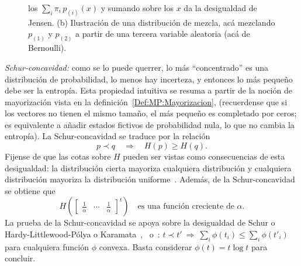 \begin{propiedades}
\begin{figure}[h!]
{    los $\sum_i \pi_i \, p_{(i)}(x)$ y sumando sobre los $x$  da la desigualdad de
    Jensen.  (b) Ilustraci\'on de  una distribuci\'on de mezcla, ac\'a mezclando
    $p_{(1)}$ y $p_{(2)}$  a partir de una tercera  variable aleatoria (ac\'a de
    Bernoulli).}
  \label{Fig:SZ:Concavidad}
  \end{figure}
%
\setcounter{PropSchurConcavidad}{\value{enumi}}
\item\label{Prop:SZ:Schurconcavidad}  {\it Schur-concavidad:}  como se  lo puede
  querrer, lo  m\'as ``concentrado'' es  una distribuci\'on de  probabilidad, lo
  menos hay  incerteza, y  entonces lo m\'as  peque\~no debe ser  la entrop\'ia.
  Esta propiedad intuitiva  se resuma a partir de  la noci\'on de mayorizaci\'on
  vista       en      la       definici\'on~\ref{Def:MP:Mayorizacion},
  (recuerdense  que  si  los  vectores  no
  tienen  el mismo  tama\~no, el  m\'as peque\~no  es completado  por  ceros; es
  equivalente a a\~nadir estados fictivos de probabilidad nula, lo que no cambia
  la entrop\'ia).
  La  Schur-concavidad  se  traduce  por  la  relaci\'on
  \[
  p \prec  q \quad \Rightarrow  \quad H(p) \ge  H(q).
  \]
  Fijense de  que las cotas  sobre $H$ pueden  ser vistas como  consecuencias de
  esta desigualdad: la  distribuci\'on cierta mayoriza cualquiera distribuci\'on
  y  cualquiera distribuci\'on  mayoriza la  distribuci\'on uniforme~\cite[p.~9,
  (6)-(8)]{MarOlk11}.  Adem\'as, de la Schur-concavidad se obtiene que
  \[
  H\left( \begin{bmatrix}  \frac1\alpha & \cdots  & \frac1\alpha \end{bmatrix}^t
  \right) \quad \mbox{es una funci\'on creciente de } \alpha.
  \]
  La prueba  de la  Schur-concavidad se  apoya sobre la  desigualdad de  Schur o
  Hardy-Littlewood-P\'olya    o     Karamata~\cite{Sch23,    HarLit29,    Kar32,
    HarLit52},~\cite[Cap.~3,                                 Prop.~C.1]{MarOlk11}
  o~\cite[Teorema~II.3.1]{Bha97}: $t \prec t' \: \Rightarrow \: \sum_i \phi(t_i)
  \le  \sum_i  \phi(t'_i)$  para  cualquiera  funci\'on  $\phi$  convexa.  Basta
  considerar $\phi(t) = t \log t$ para concluir.
\end{propiedades}
%


